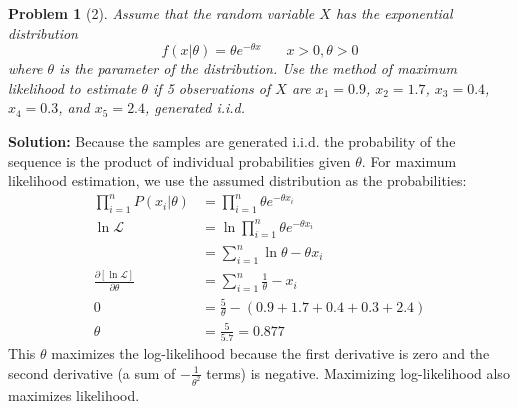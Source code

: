 \documentclass[11pt]{article}
\theoremstyle{quest}
\newtheorem*{question}{Problem}
\newcommand{\lhood}{\mathscr{L}}
\begin{document}
\begin{question}[2]
Assume that the random variable $X$ has the exponential distribution
\[
f(x|\theta) = \theta e^{-\theta x} \ \ \ \ \ \ \ \ x > 0, \theta > 0
\]
where $\theta$ is the parameter of the distribution. Use the method of maximum likelihood to estimate $\theta$ if 5 observations of $X$ are $x_1 = 0.9$, $x_2 = 1.7$, $x_3 = 0.4$, $x_4 = 0.3$, and $x_5 = 2.4$, generated i.i.d.
\end{question}
\vspace{12pt}
\textbf{Solution:}
Because the samples are generated i.i.d. the probability of the sequence is the product of individual probabilities given $\theta$. For maximum likelihood estimation, we use the assumed distribution as the probabilities: \begin{align*}
\prod_{i=1}^n P(x_i|\theta) &= \prod_{i=1}^n \theta e^{-\theta x_i}\\
\ln\lhood &= \ln{\prod_{i=1}^n \theta e^{-\theta x_i}}\\
&= \sum_{i=1}^n \ln\theta - \theta x_i\\
\frac{\partial[\ln\lhood]}{\partial\theta} &= \sum_{i=1}^n \frac1{\theta}-x_i\\
0 &= \frac5{\theta}-(0.9+1.7+0.4+0.3+2.4)\\
\theta &= \frac5{5.7} = 0.877
\end{align*}
This $\theta$ maximizes the log-likelihood because the first derivative is zero and the second derivative (a sum of $-\frac1{\theta^2}$ terms) is negative. Maximizing log-likelihood also maximizes likelihood.
\newpage
\end{document}
